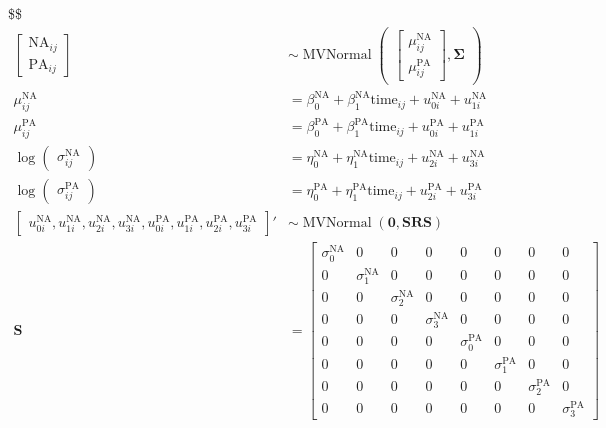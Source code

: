 \documentclass[]{article}
\begin{document}
\$\$ \begin{align*}
\begin{bmatrix} \text{NA}_{ij} \\ \text{PA}_{ij} \end{bmatrix} & \sim \operatorname{MVNormal}\begin{pmatrix} \begin{bmatrix} 
\mu_{ij}^\text{NA} \\ \mu_{ij}^\text{PA} \end{bmatrix}, \mathbf \Sigma \end{pmatrix} \\

\mu_{ij}^\text{NA} & = \beta_0^\text{NA} + \beta_1^\text{NA} \text{time}_{ij} + u_{0i}^\text{NA} + u_{1i}^\text{NA} \\
\mu_{ij}^\text{PA} & = \beta_0^\text{PA} + \beta_1^\text{PA} \text{time}_{ij} + u_{0i}^\text{PA} + u_{1i}^\text{PA} \\
\log \begin{pmatrix} \sigma_{ij}^\text{NA} \end{pmatrix} & = \eta_0^\text{NA} + \eta_1^\text{NA} \text{time}_{ij} + u_{2i}^\text{NA} + u_{3i}^\text{NA} \\
\log \begin{pmatrix} \sigma_{ij}^\text{PA} \end{pmatrix} & = \eta_0^\text{PA} + \eta_1^\text{PA} \text{time}_{ij} + u_{2i}^\text{PA} + u_{3i}^\text{PA}  \\

\begin{bmatrix} u_{0i}^\text{NA}, u_{1i}^\text{NA}, u_{2i}^\text{NA}, u_{3i}^\text{NA}, u_{0i}^\text{PA}, u_{1i}^\text{PA}, u_{2i}^\text{PA}, u_{3i}^\text{PA} \end{bmatrix}' & \sim \operatorname{MVNormal}(\mathbf 0, \mathbf S \mathbf R \mathbf S) \\

\mathbf S & = \begin{bmatrix} \sigma_0^\text{NA} & 0 & 0 & 0 & 0 & 0 & 0 & 0 \\ 0 & \sigma_1^\text{NA} & 0 & 0 & 0 & 0 & 0 & 0 \\ 0 & 0 & \sigma_2^\text{NA} & 0 & 0 & 0 & 0 & 0 \\ 0 & 0 & 0 & \sigma_3^\text{NA} & 0 & 0 & 0 & 0 \\ 0 & 0 & 0 & 0 & \sigma_0^\text{PA} & 0 & 0 & 0 \\ 0 & 0 & 0 & 0 & 0 & \sigma_1^\text{PA} & 0 & 0 \\ 0 & 0 & 0 & 0 & 0 & 0 & \sigma_2^\text{PA} & 0 \\ 0 & 0 & 0 & 0 & 0 & 0 & 0 & \sigma_3^\text{PA}  \end{bmatrix} \\


\end{align*}
\end{document}
